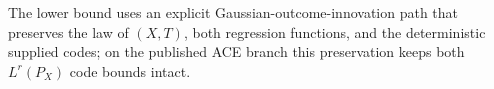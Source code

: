 The lower bound uses an explicit Gaussian-outcome-innovation path that preserves the law of \((X,T)\), both regression functions, and the deterministic supplied codes; on the published ACE branch this preservation keeps both \(L^r(P_X)\) code bounds intact.